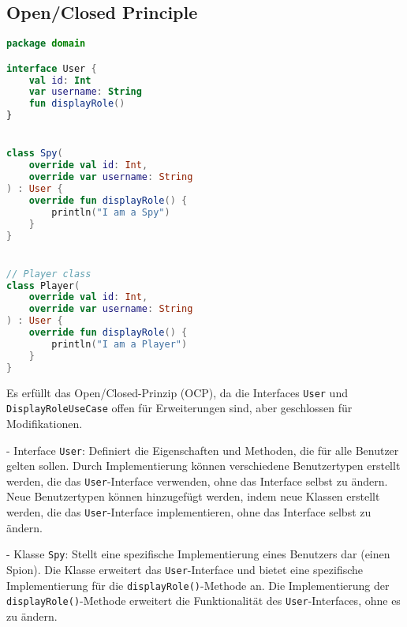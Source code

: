\subsection*{Open/Closed Principle}

\begin{lstlisting}[language=Kotlin, caption={Open/Closed Principle}, label={lst:10}]
package domain

interface User {
    val id: Int
    var username: String
    fun displayRole()
}


class Spy(
    override val id: Int,
    override var username: String
) : User {
    override fun displayRole() {
        println("I am a Spy")
    }
}


// Player class
class Player(
    override val id: Int,
    override var username: String
) : User {
    override fun displayRole() {
        println("I am a Player")
    }
}

\end{lstlisting}

Es erfüllt das Open/Closed-Prinzip (OCP), da die Interfaces \texttt{User} und \texttt{DisplayRoleUseCase} offen für Erweiterungen sind, aber geschlossen für Modifikationen.

- Interface \texttt{User}: Definiert die Eigenschaften und Methoden, die für alle Benutzer gelten sollen. Durch Implementierung können verschiedene Benutzertypen erstellt werden, die das \texttt{User}-Interface verwenden, ohne das Interface selbst zu ändern. Neue Benutzertypen können hinzugefügt werden, indem neue Klassen erstellt werden, die das \texttt{User}-Interface implementieren, ohne das Interface selbst zu ändern.

- Klasse \texttt{Spy}: Stellt eine spezifische Implementierung eines Benutzers dar (einen Spion). Die Klasse erweitert das \texttt{User}-Interface und bietet eine spezifische Implementierung für die \texttt{displayRole()}-Methode an. Die Implementierung der \texttt{displayRole()}-Methode erweitert die Funktionalität des \texttt{User}-Interfaces, ohne es zu ändern.

